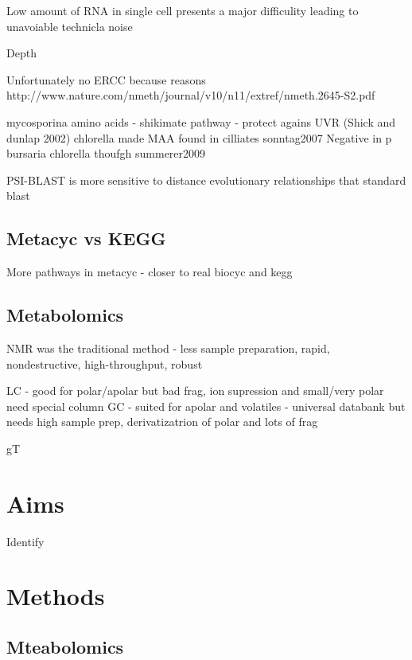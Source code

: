 Low amount of RNA in single cell presents a major difficulity leading to unavoiable technicla noise \citep{Brennecke2013}

Depth


Unfortunately no ERCC because reasons
http://www.nature.com/nmeth/journal/v10/n11/extref/nmeth.2645-S2.pdf




mycosporina amino acids - shikimate pathway - protect agains UVR \citep{Sommaruga2009} (Shick and dunlap 2002)
chlorella made MAA found in cilliates sonntag2007 
Negative in p bursaria chlorella thoufgh summerer2009


PSI-BLAST is more sensitive to distance evolutionary relationships that standard blast

\subsection{Metacyc vs KEGG}

More pathways in metacyc - closer to real  
biocyc and kegg 


\subsection{Metabolomics}

NMR was the traditional method - less sample preparation, rapid, nondestructive, high-throughput, robust

LC - good for polar/apolar but bad frag, ion supression and small/very polar need special column
GC - suited for apolar and volatiles - universal databank but needs high sample prep, derivatizatrion of polar and lots of frag





gT



\section{Aims}

Identify 



\section{Methods}



\subsection{Mteabolomics}



